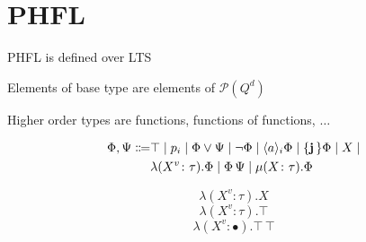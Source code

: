 \begin{frame}
\begin{figure}[ht]
\end{figure}


\end{frame}

\section{PHFL}

\begin{frame}

	\begin{compactenum}[$\bullet$]
	\item PHFL is defined over LTS
	\item<2-> Elements of base type are elements of $\mathcal{P}(Q^d)$
	\item<3-> Higher order types are functions, functions of functions, $\dots$
	\end{compactenum}	
	
      \begin{align*}
             \Phi,\Psi\Coloneqq&\top \mid p_i \mid \Phi \vee \Psi \mid \neg \Phi \mid \langle a \rangle_i \Phi \mid
        \{\emph{j}\,\} \Phi \mid X \mid 
        \\&\lambda (X^v\colon\tau).\Phi \mid \Phi\,\Psi\mid  \mu (X\colon\tau).\Phi
        \end{align*}

\begin{multicols}{3}
  \begin{equation}
    \lambda (X^v\colon\tau).X
  \end{equation}\break
  \begin{equation}
    \lambda (X^v\colon\tau).\top
  \end{equation}\break
  \begin{equation}
    \lambda (X^v\colon\bullet).\top\,\top
  \end{equation}
\end{multicols}
\end{frame}

